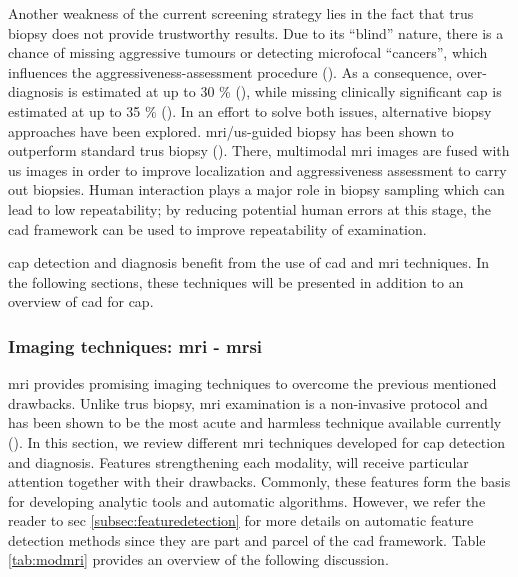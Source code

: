 Another weakness of the current screening strategy lies in the fact that \ac{trus} biopsy does not provide trustworthy results. Due to its ``blind'' nature, there is a chance of missing aggressive tumours or detecting microfocal ``cancers'', which influences the aggressiveness-assessment procedure (\cite{Noguchi2001}). As a consequence, over-diagnosis is estimated at up to 30 \% (\cite{Haas2007}), while missing clinically significant \ac{cap} is estimated at up to 35 \% (\cite{Taira2010}). In an effort to solve both issues, alternative biopsy approaches have been explored. \ac{mri}/\ac{us}-guided biopsy has been shown to outperform standard \ac{trus} biopsy (\cite{Delongchamps2013}). There, multimodal \ac{mri} images are fused with \ac{us} images in order to improve localization and aggressiveness assessment to carry out biopsies. Human interaction plays a major role in biopsy sampling which can lead to low repeatability; by reducing potential human errors at this stage, the \acs{cad} framework can be used to improve repeatability of examination.

\ac{cap} detection and diagnosis benefit from the use of \acs{cad} and \ac{mri} techniques. In the following sections, these techniques will be presented in addition to an overview of \acs{cad} for \ac{cap}.

\subsubsection{Imaging techniques: \ac{mri} - \ac{mrsi}} \label{subsubsec:mrimrsi}

\ac{mri} provides promising imaging techniques to overcome the previous mentioned drawbacks. Unlike \ac{trus} biopsy, \ac{mri} examination is a non-invasive protocol and has been shown to be the most acute and harmless technique available currently (\cite{Turkbey2012}).
In this section, we review different \ac{mri} techniques developed for \ac{cap} detection and diagnosis. Features strengthening each modality, will receive particular attention together with their drawbacks. Commonly, these features form the basis for developing analytic tools and automatic algorithms. However, we refer the reader to \acs{sec} \ref{subsec:featuredetection} for more details on automatic feature detection methods since they are part and parcel of the \acs{cad} framework. Table \ref{tab:modmri} provides an overview of the following discussion.

